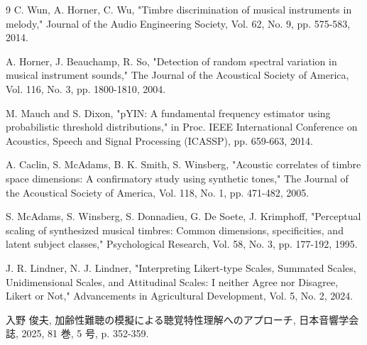 \documentclass[lualatex,book,openany,paper=a4paper,jafontsize=11.5pt,jafontscale=1.05]{jlreq}
\begin{document}
\begin{thebibliography}{9}
C. Wun, A. Horner, C. Wu, "Timbre discrimination of musical instruments in melody," Journal of the Audio Engineering Society, Vol. 62, No. 9, pp. 575-583, 2014.

A. Horner, J. Beauchamp, R. So, "Detection of random spectral variation in musical instrument sounds," The Journal of the Acoustical Society of America, Vol. 116, No. 3, pp. 1800-1810, 2004.

M. Mauch and S. Dixon, "pYIN: A fundamental frequency estimator using probabilistic threshold distributions," in Proc. IEEE International Conference on Acoustics, Speech and Signal Processing (ICASSP), pp. 659-663, 2014.

A. Caclin, S. McAdams, B. K. Smith, S. Winsberg, "Acoustic correlates of timbre space dimensions: A confirmatory study using synthetic tones," The Journal of the Acoustical Society of America, Vol. 118, No. 1, pp. 471-482, 2005.

S. McAdams, S. Winsberg, S. Donnadieu, G. De Soete, J. Krimphoff, "Perceptual scaling of synthesized musical timbres: Common dimensions, specificities, and latent subject classes," Psychological Research, Vol. 58, No. 3, pp. 177-192, 1995.

 J. R. Lindner, N. J. Lindner, "Interpreting Likert-type Scales, Summated Scales, Unidimensional Scales, and Attitudinal Scales: I neither Agree nor Disagree, Likert or Not," Advancements in Agricultural Development, Vol. 5, No. 2, 2024.

 入野 俊夫, 加齢性難聴の模擬による聴覚特性理解へのアプローチ, 日本音響学会誌, 2025, 81 巻, 5 号, p. 352-359.

\end{thebibliography}
\end{document}
